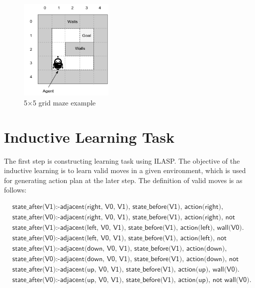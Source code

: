 \begin{figure}[!htb]
\centering
\includegraphics[width=0.4\textwidth]{./figures/environment_example}
\caption{5$\times$5 grid maze example}
\label{environment_example}
\end{figure}

\section{Inductive Learning Task}
\label{sec:inductive_learning_task}
The first step is constructing learning task using ILASP. The objective of the inductive learning is to learn valid moves in a given environment, which is used for generating action plan at the later step.
The definition of valid moves is as follows:

\begin{equation}
\begin{split}
&\textsf{state\_after(V1):-adjacent(right, V0, V1), state\_before(V1), action(right), wall(V0).}\\
&\textsf{state\_after(V0):-adjacent(right, V0, V1), state\_before(V1), action(right), not wall(V0).}\\
&\textsf{state\_after(V1):-adjacent(left, V0, V1), state\_before(V1), action(left), wall(V0).}\\
&\textsf{state\_after(V0):-adjacent(left, V0, V1), state\_before(V1), action(left), not wall(V0).}\\
&\textsf{state\_after(V1):-adjacent(down, V0, V1), state\_before(V1), action(down), wall(V0).}\\
&\textsf{state\_after(V0):-adjacent(down, V0, V1), state\_before(V1), action(down), not wall(V0).}\\
&\textsf{state\_after(V1):-adjacent(up, V0, V1), state\_before(V1),  action(up), wall(V0).}\\
&\textsf{state\_after(V0):-adjacent(up, V0, V1), state\_before(V1), action(up), not wall(V0).}
\end{split}
\label{target_hypothesis}
\end{equation}

